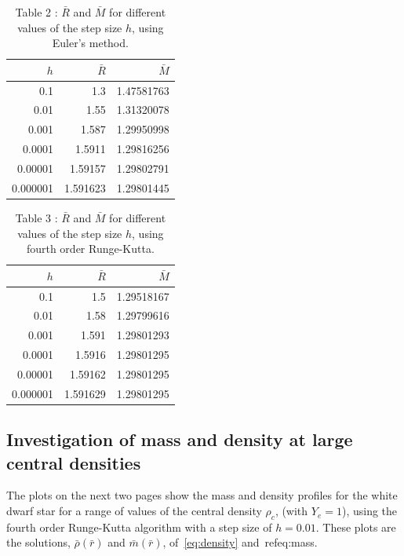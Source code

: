 \documentclass[a4paper]{IEEEtran}
\begin{document}
    \begin{table}
    \caption{Table 2 : $\bar{R}$ and $\bar{M}$ for different values of the 
                  step size $h$, using Euler's method.} 
    \label{tbl:R-M-euler}
    \begin{center}
    \begin{tabular}{r|rr} \hline
    $h$         &   $\bar{R}$   &   $\bar{M}$       \\ \hline
    0.1         &   1.3         &   1.47581763      \\ 
    0.01        &   1.55        &   1.31320078      \\ 
    0.001       &   1.587       &   1.29950998      \\ 
    0.0001      &   1.5911      &   1.29816256      \\ 
    0.00001     &   1.59157     &   1.29802791      \\ 
    0.000001    &   1.591623    &   1.29801445      \\ \hline   
    \end{tabular}
    \end{center}
    \end{table} 

    \begin{table}
    \caption{Table 3 : $\bar{R}$ and $\bar{M}$ for different values of the step 
                  size $h$, using fourth order Runge-Kutta.}
    \label{tbl:R-M-runge-kutta} 
    \begin{center}
    \begin{tabular}{r|rr} \hline
    $h$         &   $\bar{R}$   &   $\bar{M}$       \\ \hline
    0.1         &   1.5         &   1.29518167      \\ 
    0.01        &   1.58        &   1.29799616      \\ 
    0.001       &   1.591       &   1.29801293      \\ 
    0.0001      &   1.5916      &   1.29801295      \\ 
    0.00001     &   1.59162     &   1.29801295      \\ 
    0.000001    &   1.591629    &   1.29801295      \\ \hline
    \end{tabular}
    \end{center}
    \end{table} 

    \subsection{Investigation of mass and density at large central densities}
    The plots on the next two pages show the mass and density profiles for
    the white dwarf star for a range of values of the central density $\rho_c$,
    (with $Y_e = 1$), using the fourth order Runge-Kutta algorithm with
    a step size of $h = 0.01$.
    These plots are the solutions, $\bar{\rho}(\bar{r})$ and $\bar{m}(\bar{r})$,
    of~\ref{eq:density} and~ref{eq:mass}.
\end{document}
